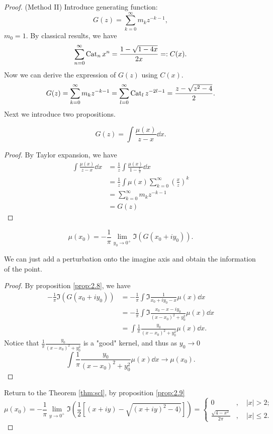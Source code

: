 \begin{proof}{(Method II)}
Introduce generating function: 
\[
G(z) = \sum_{k=0}^\infty m_k z^{-k-1},
\]
$m_0 =1$. By classical results, we have
\[
\sum_{n=0}^\infty \operatorname{Cat}_n x^n = \frac{1-\sqrt{1-4x}}{2x} =: C(x).
\]
Now we can derive the expression of $G(z)$ using $C(x)$.
\[
    G(z) = \sum_{k=0}^\infty m_k z^{-k-1} = \sum_{l=0}^\infty \operatorname{Cat}_l z^{-2l-1} = \frac{z-\sqrt{z^2-4}}{2}.
\]
Next we introduce two propositions.
\begin{prop}
    \label{prop:2.8}
    \[
    G(z) = \int \frac{\mu(x)}{z-x} \dd x.
    \]
\end{prop}
\begin{proof}
    By Taylor expansion, we have
    \begin{align*}
    \int \frac{\mu(x)}{z-x} \dd x 
    &= \frac{1}{z} \int \frac{\mu(x)}{1-\frac{x}{z}}\dd x\\
    &= \frac{1}{z}\int \mu(x)\sum_{k=0}^\infty\left( \frac{x}{z}\right)^k\\
    &=\sum_{k=0}^\infty m_k z^{-k-1} \\
    &= G(z)
    \end{align*}
\end{proof}

\begin{prop}
    \label{prop:2.9}
    \[
    \mu(x_0) = -\frac{1}{\pi} \lim_{y_0\to 0^+} \Im (G(x_0+iy_0)).
    \]
\end{prop}
\begin{rem}
    We can just add a perturbation onto the imagine axis and obtain the information of the point.
\end{rem}

\begin{proof}
    By proposition \ref{prop:2.8}, we have
    \begin{align}
        -\frac{1}{\pi}  \Im (G(x_0+iy_0))
        &= -\frac{1}{\pi} \int  \Im \frac{1}{x_0+iy_0-x} \mu(x)\dd x\\
        &= -\frac{1}{\pi} \int \Im \frac{x_0-x-iy_0}{(x-x_0)^2+y_0^2}\mu(x) \dd x\\
        &= \int \frac{1}{\pi} \frac{y_0}{(x-x_0)^2+y_0^2}\mu(x) \dd x.
    \end{align}
    Notice that $\frac{1}{\pi} \frac{y_0}{(x-x_0)^2+y_0^2}$ is a "good" kernel, and thus as $y_0\to 0$
    \[
    \int \frac{1}{\pi} \frac{y_0}{(x-x_0)^2+y_0^2}\mu(x) \dd x \to \mu(x_0).
    \]
\end{proof}
Return to the Theorem \ref{thm:scl}, by proposition \ref{prop:2.9}
\[
\mu(x_0) = -\frac{1}{\pi} \lim_{y\to 0^+} \Im \left( \frac{1}{2}\left[(x+iy) - \sqrt{(x+iy)^2 - 4)}\right]
\right) = \begin{cases}
    0  &, \quad |x|>2;\\
    \frac{\sqrt{4-x^2}}{2\pi} &,\quad |x|\le 2.
\end{cases}
\]
\end{proof}

